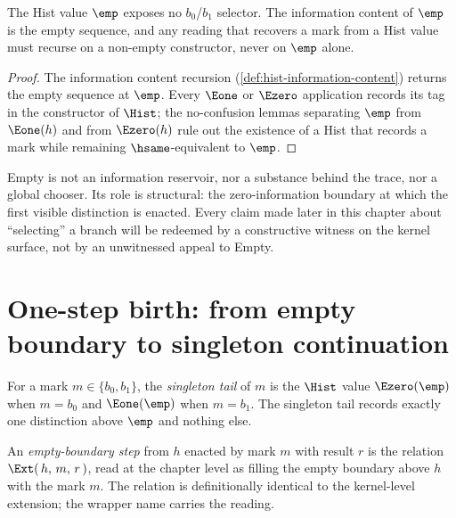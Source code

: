 \begin{lemma}
\label{thm:efm-empty-no-selector}
The Hist value $\emp$ exposes no $b_0$/$b_1$ selector. The information content of $\emp$ is the empty sequence, and any reading that recovers a mark from a Hist value must recurse on a non-empty constructor, never on $\emp$ alone.
\end{lemma}
\begin{proof}
The information content recursion (\autoref{def:hist-information-content}) returns the empty sequence at $\emp$. Every $\Eone$ or $\Ezero$ application records its tag in the constructor of $\Hist$; the no-confusion lemmas separating $\emp$ from $\Eone(h)$ and from $\Ezero(h)$ rule out the existence of a Hist that records a mark while remaining $\hsame$-equivalent to $\emp$.
\end{proof}

\begin{remark}
\label{rem:efm-no-hidden-subject}
Empty is not an information reservoir, nor a substance behind the trace, nor a global chooser. Its role is structural: the zero-information boundary at which the first visible distinction is enacted. Every claim made later in this chapter about ``selecting'' a branch will be redeemed by a constructive witness on the kernel surface, not by an unwitnessed appeal to Empty.
\end{remark}

\section{One-step birth: from empty boundary to singleton continuation}
\label{sec:efm-one-step-birth}

\begin{definition}
\label{def:efm-singleton-tail}
For a mark $m \in \{b_0, b_1\}$, the \emph{singleton tail} of $m$ is the $\Hist$ value $\Ezero(\emp)$ when $m = b_0$ and $\Eone(\emp)$ when $m = b_1$. The singleton tail records exactly one distinction above $\emp$ and nothing else.
\end{definition}

\begin{definition}
\label{def:efm-empty-step}
An \emph{empty-boundary step} from $h$ enacted by mark $m$ with result $r$ is the relation $\Ext(\,h,\,m,\,r\,)$, read at the chapter level as filling the empty boundary above $h$ with the mark $m$. The relation is definitionally identical to the kernel-level extension; the wrapper name carries the reading.
\end{definition}

